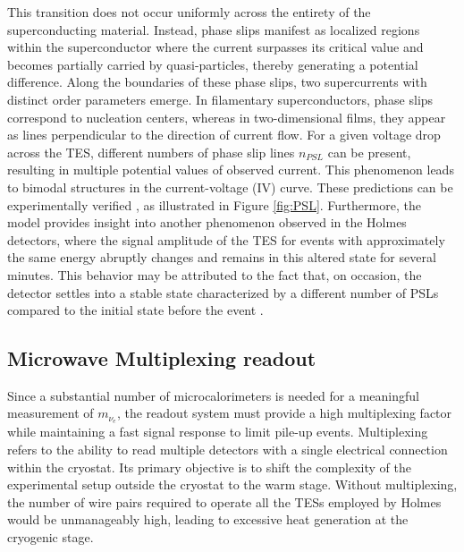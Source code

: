 This transition does not occur uniformly across the entirety of the superconducting material. Instead, phase slips
manifest as localized regions within the superconductor where the current surpasses its critical value and becomes
partially carried by quasi-particles, thereby generating a potential difference. Along the boundaries of these phase
slips, two supercurrents with distinct order parameters emerge. In filamentary superconductors, phase slips correspond
to nucleation centers, whereas in two-dimensional films, they appear as lines perpendicular to the direction of current
flow. For a given voltage drop across the TES, different numbers of phase slip lines $n_{PSL}$ can be present, resulting
in multiple potential values of observed current. This phenomenon leads to bimodal structures in the current-voltage (IV) curve.
These predictions can be experimentally verified  \cite{PSL}, as illustrated in Figure \ref{fig:PSL}.
Furthermore, the model provides insight into another phenomenon observed in the Holmes detectors, where the signal
amplitude of the TES for events with approximately the same energy abruptly changes and remains in this altered state
for several minutes. This behavior may be attributed to the fact that, on occasion, the detector settles into a stable
state characterized by a different number of PSLs compared to the initial state before the event \cite{borghesi2022toward}.



\subsection{Microwave Multiplexing readout}\label{sec:muMUX}
Since a substantial
number of microcalorimeters is needed for a meaningful measurement of $m_{\nu_{e}}$, the readout system must provide a
high multiplexing factor while maintaining a fast signal response to limit pile-up events. Multiplexing refers to the ability to read
multiple detectors with a single electrical connection within the cryostat.
Its primary objective is to shift the complexity of the experimental setup outside the cryostat to the warm stage. 
Without multiplexing, the number of wire
pairs required to operate all the TESs employed by Holmes would be unmanageably high, leading to excessive heat generation at the cryogenic stage.

